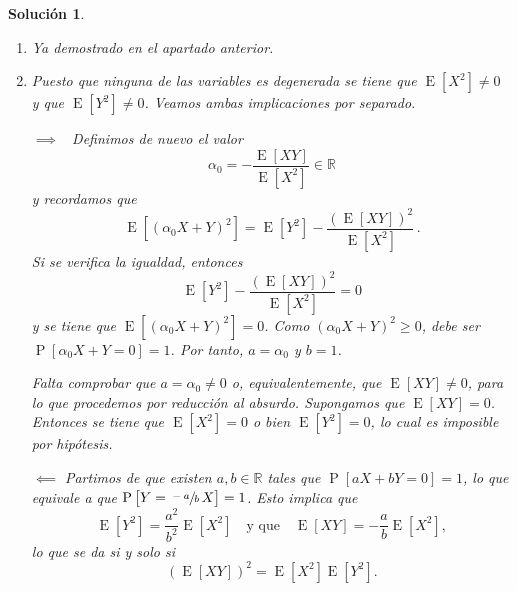 \documentclass[
  a4paper,
  spanish,
  12pt,
]{scrartcl}
\theoremstyle{ejercicio-style}
\theoremstyle{remark-style}
\newtheorem*{sol}{Solución}
\begin{document}
\begin{sol}
\begin{enumerate}
  	\item Ya demostrado en el apartado anterior.
  	
  	\item Puesto que ninguna de las variables es degenerada se tiene que \(\operatorname{E}[X^2] \neq 0\) y que \(\operatorname{E}[Y^2] \neq 0\). Veamos ambas implicaciones por separado.
  
    \(\boxed{\implies}\) \ Definimos de nuevo el valor \[
      \alpha_0 = -\frac{\operatorname{E}[XY]}{\operatorname{E}[X^2]} \in \mathbb{R}
    \] y recordamos que \[
      \operatorname{E}\left[(\alpha_0 X + Y)^2\right] = \operatorname{E}[Y^2] - \frac{\left(\operatorname{E}[XY]\right)^2}{\operatorname{E}[X^2]}\,.
    \] 
    Si se verifica la igualdad, entonces \[
      \operatorname{E}[Y^2] - \frac{\left(\operatorname{E}[XY]\right)^2}{\operatorname{E}[X^2]} = 0
    \] y se tiene que \(\operatorname{E}\left[(\alpha_0 X + Y)^2\right] = 0\). 
    Como \((\alpha_0 X + Y)^2 \geq 0\), debe ser \(\operatorname{P}[\alpha_0 X + Y = 0] = 1\). 
    Por tanto, \(a = \alpha_0\) y \(b=1\).

    Falta comprobar que \(a = \alpha_0 \neq 0\) o, equivalentemente, que \(\operatorname{E}[XY] \neq 0\), para lo que procedemos por reducción al absurdo. 
    Supongamos que \(\operatorname{E}[XY] = 0\). 
    Entonces se tiene que \(\operatorname{E}[X^2] = 0\) o bien \(\operatorname{E}[Y^2] = 0\), lo cual es imposible por hipótesis.

    \(\boxed{\impliedby}\) Partimos de que existen \(a, b \in \mathbb R\) tales que \(\operatorname{P}[aX + bY = 0] = 1\), lo que equivale a que \(\operatorname{P}\left[Y = \sfrac{-a}{b}\,X\right] = 1\). 
    Esto implica que \[
      \operatorname{E}[Y^2] = \frac{a^2}{b^2}\operatorname{E}[X^2] \quad \text{y que} \quad \operatorname{E}[XY] = -\frac{a}{b}\operatorname{E}[X^2],
    \] lo que se da si y solo si \[
      \left(\operatorname{E}[XY]\right)^2 = \operatorname{E}[X^2] \operatorname{E}[Y^2].
    \]
  	
  \end{enumerate}
\end{sol}
\end{document}
